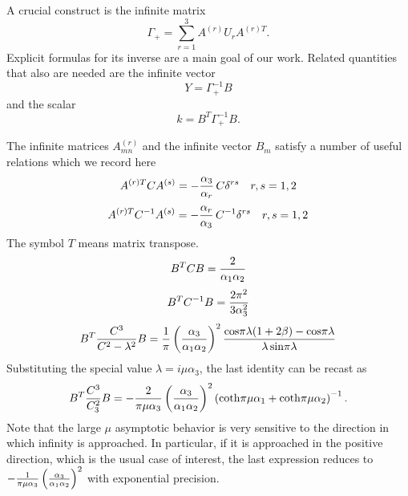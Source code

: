 \documentclass[a4paper,12pt]{article}
\begin{document}
A crucial construct is the infinite matrix
\begin{equation}
\Gamma_+ = \sum_{r=1}^3 A^{(r)} U_r A^{(r)T}.
\end{equation}
Explicit formulas for its inverse are a main goal of our work.
Related quantities that also are needed are the infinite vector
\begin{equation}
Y = \Gamma_+^{-1} B
\end{equation}
and the scalar
\begin{equation}
k = B^T \Gamma_+^{-1} B.
\end{equation}

The infinite matrices $A^{(r)}_{mn}$ and the infinite vector $B_m$
satisfy a number of useful relations which we record here
\begin{equation}
A^{(r) T} C A^{(s)} = - {\alpha_3 \over \alpha_r}\, C \delta^{rs}
\quad r,s = 1,2
\end{equation}
\begin{equation}
A^{(r) T} C^{-1} A^{(s)} = - {\alpha_r \over \alpha_3}\, C^{-1}
\delta^{rs} \quad r,s = 1,2
\end{equation}
The symbol $T$ means matrix transpose.
\begin{equation}
B^T C B = {2\over \alpha_1 \alpha_2}
\end{equation}
\begin{equation}
B^T C^{-1} B = {2 \pi^2 \over 3 \alpha_3^2}
\end{equation}
\begin{equation}
B^T {C^3 \over C^2 -\lambda^2} B = {1 \over \pi} \left( {\alpha_3
\over \alpha_1 \alpha_2} \right)^2 {{\rm cos} \pi \lambda
(1+2\beta) - {\rm cos} \pi \lambda \over \lambda\, {\rm sin} \pi
\lambda}
\end{equation}
Substituting the special value $\lambda = i \mu \alpha_3$, the
last identity can be recast as
\begin{equation}
B^T {C^3 \over C_3^2} B = -{2 \over \pi\mu\alpha_3} \left(
{\alpha_3 \over \alpha_1 \alpha_2} \right)^2\left( {\rm coth} \pi
\mu \alpha_1 + {\rm coth} \pi \mu \alpha_2 \right)^{-1}.
\end{equation}
Note that the large $\mu$ asymptotic behavior is very sensitive to
the direction in which infinity is approached. In particular, if
it is approached in the positive direction, which is the usual
case of interest, the last expression reduces to $-{1 \over
\pi\mu\alpha_3} \left( {\alpha_3 \over \alpha_1 \alpha_2}
\right)^2$ with exponential precision.
\end{document}
